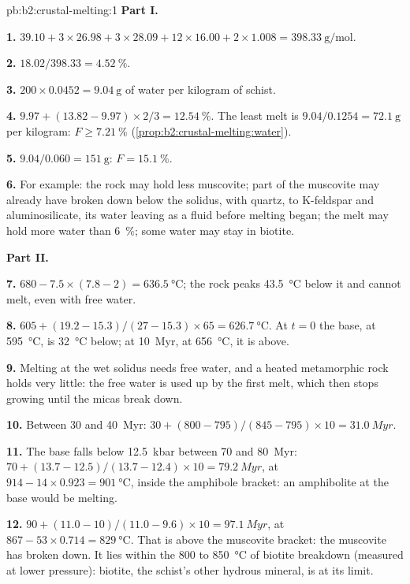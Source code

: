 \begin{solution}{pb:b2:crustal-melting:1}
\noindent\textbf{Part I.}

\textbf{1.} $39.10 + 3\times26.98 + 3\times28.09 + 12\times16.00 + 2\times1.008 =
\qty{398.33}{\gram\per\mole}$.

\textbf{2.} $18.02/398.33 = \qty{4.52}{\percent}$.

\textbf{3.} $200\times0.0452 = \qty{9.04}{\gram}$ of water per kilogram of schist.

\textbf{4.} $9.97 + (13.82 - 9.97)\times2/3 = \qty{12.54}{\percent}$. The least melt is
$9.04/0.1254 = \qty{72.1}{\gram}$ per kilogram: $F \ge \qty{7.21}{\percent}$
(\cref{prop:b2:crustal-melting:water}).

\textbf{5.} $9.04/0.060 = \qty{151}{\gram}$: $F = \qty{15.1}{\percent}$.

\textbf{6.} For example: the rock may hold less muscovite; part of the muscovite may
already have broken down below the solidus, with quartz, to K-feldspar and
aluminosilicate, its water leaving as a fluid before melting began; the melt may hold more
water than \qty{6}{\percent}; some water may stay in biotite.

\noindent\textbf{Part II.}

\textbf{7.} $680 - 7.5\times(7.8 - 2) = \qty{636.5}{\celsius}$; the rock peaks
\qty{43.5}{\celsius} below it and cannot melt, even with free water.

\textbf{8.} $605 + (19.2 - 15.3)/(27 - 15.3)\times65 = \qty{626.7}{\celsius}$. At
$t = 0$ the base, at \qty{595}{\celsius}, is \qty{32}{\celsius} below; at
\qty{10}{Myr}, at \qty{656}{\celsius}, it is above.

\textbf{9.} Melting at the wet solidus needs free water, and a heated metamorphic rock
holds very little: the free water is used up by the first melt, which then stops growing
until the micas break down.

\textbf{10.} Between 30 and \qty{40}{Myr}: $30 + (800 - 795)/(845 - 795)\times10 =
\qty{31.0}{Myr}$.

\textbf{11.} The base falls below \qty{12.5}{kbar} between 70 and \qty{80}{Myr}:
$70 + (13.7 - 12.5)/(13.7 - 12.4)\times10 = \qty{79.2}{Myr}$, at
$914 - 14\times0.923 = \qty{901}{\celsius}$, inside the amphibole bracket: an amphibolite
at the base would be melting.

\textbf{12.} $90 + (11.0 - 10)/(11.0 - 9.6)\times10 = \qty{97.1}{Myr}$, at $867 -
53\times0.714 = \qty{829}{\celsius}$. That is above the muscovite bracket: the muscovite
has broken down. It lies within the 800 to \qty{850}{\celsius} of biotite breakdown
(measured at lower pressure): biotite, the schist's other hydrous mineral, is at its
limit.


\end{solution}

